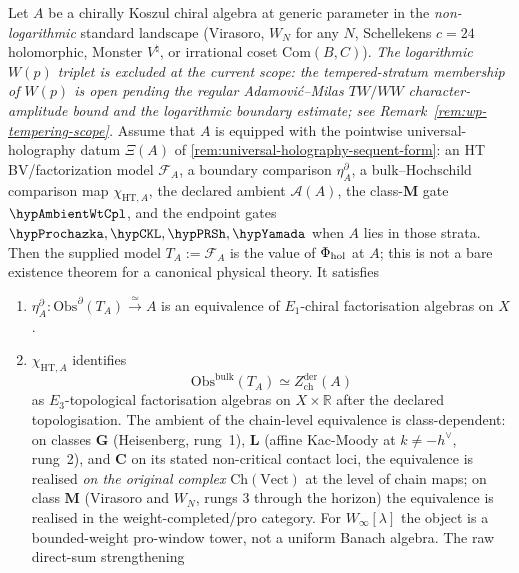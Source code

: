 \begin{theorem}
Let $A$ be a chirally Koszul chiral algebra at generic parameter in
the \emph{non-logarithmic} standard landscape (Virasoro, $W_{N}$
for any $N$, Schellekens $c = 24$ holomorphic, Monster $V^{\natural}$,
or irrational coset $\mathrm{Com}(B, C)$). \emph{The logarithmic
$W(p)$ triplet is excluded at the current scope: the tempered-stratum
membership of $W(p)$ is open pending the regular Adamovi\'c--Milas
$TW/WW$ character-amplitude bound and the logarithmic boundary estimate;
see
Remark~\ref{rem:wp-tempering-scope}.}
	Assume that \(A\) is equipped with the pointwise
	universal-holography datum \(\Xi(A)\) of
	\cref{rem:universal-holography-sequent-form}: an HT
	BV/factorization model \(\mathcal F_A\), a boundary comparison
	\(\eta^\partial_A\), a bulk--Hochschild comparison map
	\(\chi_{\mathrm{HT},A}\), the declared ambient
		\(\mathcal A(A)\), the class-\(\mathbf M\) gate
		\(\hypAmbientWtCpl\), and the endpoint gates
		\(\hypProchazka,\hypCKL,\hypPRSh,\hypYamada\) when \(A\)
		lies in those strata. Then the supplied model
	\(T_A:=\mathcal F_A\) is the value of \(\Phi_{\mathrm{hol}}\) at \(A\); this is
	not a bare existence theorem for a canonical physical theory. It
	satisfies
	\begin{enumerate}
	\item[(i)] \(\eta^\partial_A\colon
	\mathrm{Obs}^{\partial}(T_A)\xrightarrow{\simeq} A\) is an
	 equivalence of $E_{1}$-chiral factorisation algebras on $X$.
	\item[(ii)] \(\chi_{\mathrm{HT},A}\) identifies
	 \[
	 \mathrm{Obs}^{\mathrm{bulk}}(T_{A}) \simeq
	 Z^{\mathrm{der}}_{\mathrm{ch}}(A)
	 \]
	 as $E_{3}$-topological factorisation algebras on
	 $X \times \mathbb{R}$ after the declared topologisation. The
	 ambient of
	 the chain-level equivalence is class-dependent: on classes
 $\mathbf{G}$ (Heisenberg, rung~1), $\mathbf{L}$ (affine
 Kac-Moody at $k \neq -h^{\vee}$, rung~2), and $\mathbf{C}$
 on its stated non-critical contact loci, the equivalence is
 realised \emph{on the original complex}
 $\mathrm{Ch}(\mathrm{Vect})$ at the level of chain maps; on class
 $\mathbf{M}$ (Virasoro and $W_{N}$, rungs 3 through the horizon) the
 equivalence is realised in the weight-completed/pro category. For
 $W_{\infty}[\lambda]$ the object is a bounded-weight pro-window
 tower, not a uniform Banach algebra. The raw direct-sum strengthening

\end{enumerate}
\end{theorem}
